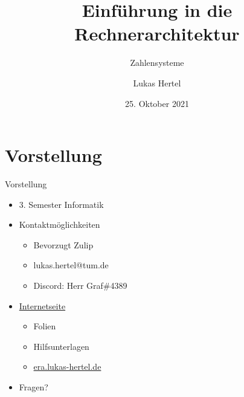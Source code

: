 \documentclass[
  german,            %
  aspectratio=169,    %
  sectionpage=false,   %
]{tumbeamer}
\title{Einführung in die Rechnerarchitektur}
\subtitle{Zahlensysteme}
\author{Lukas Hertel}
\institute{\theChairName\\\theDepartmentName\\\theUniversityName}
\date[25.10.2021]{25. Oktober 2021}
\begin{document}
\maketitle

\section{Vorstellung}
\begin{frame}{Vorstellung}
  \begin{itemize}
    \item 3. Semester Informatik
    \item Kontaktmöglichkeiten
    \begin{itemize}
    	\item Bevorzugt Zulip
        \item lukas.hertel@tum.de
        \item Discord: Herr Graf\#4389
    \end{itemize}
    \item \href{https://era.lukas-hertel.de}{Internetseite}
    \begin{itemize}
    	\item Folien
    	\item Hilfsunterlagen
    	\item \href{https://era.lukas-hertel.de}{era.lukas-hertel.de}
    \end{itemize}
	\item Fragen?
  \end{itemize}
\end{frame}
\end{document}
